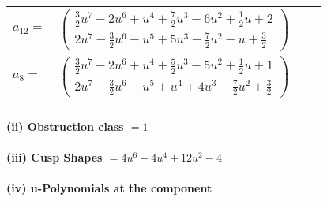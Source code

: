\documentclass[1p]{elsarticle_modified}
\theoremstyle{definition}
\begin{document}
\begin{tabular}{m{7pt} m{180pt} m{7pt} m{180pt} }
\flushright $a_{12}=$&$\begin{pmatrix}\frac{3}{2} u^7-2 u^6+u^4+\frac{7}{2} u^3-6 u^2+\frac{1}{2} u+2\\2 u^7-\frac{3}{2} u^6- u^5+5 u^3-\frac{7}{2} u^2- u+\frac{3}{2}\end{pmatrix}$ \\
\flushright $a_{8}=$&$\begin{pmatrix}\frac{3}{2} u^7-2 u^6+u^4+\frac{5}{2} u^3-5 u^2+\frac{1}{2} u+1\\2 u^7-\frac{3}{2} u^6- u^5+u^4+4 u^3-\frac{7}{2} u^2+\frac{3}{2}\end{pmatrix}$\\&\end{tabular}
\flushleft \textbf{(ii) Obstruction class $= 1$}\\~\\
\flushleft \textbf{(iii) Cusp Shapes $= 4 u^6-4 u^4+12 u^2-4$}\\~\\
\newpage\renewcommand{\arraystretch}{1}
\flushleft \textbf{(iv) u-Polynomials at the component}\newline \\
\end{document}
